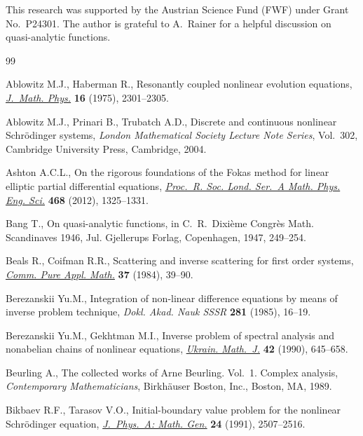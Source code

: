 \documentclass[pdftex]{sigma}
\numberwithin{equation}{section}
\begin{document}
This research was
supported by the Austrian Science Fund (FWF) under Grant No.~P24301.
The author is grateful to A.~Rainer for a helpful discussion on
quasi-analytic functions.

\begin{thebibliography}{99}
\footnotesize\itemsep=0pt

Ablowitz M.J., Haberman R., Resonantly coupled nonlinear evolution equations,
 \href{http://dx.doi.org/10.1063/1.522460}{\textit{J.~Math. Phys.}} \textbf{16} (1975), 2301--2305.

Ablowitz M.J., Prinari B., Trubatch A.D., Discrete and continuous nonlinear
 {S}chr\"odinger systems, \textit{London Mathematical Society Lecture Note
 Series}, Vol.~302, Cambridge University Press, Cambridge, 2004.

Ashton A.C.L., On the rigorous foundations of the {F}okas method for linear
 elliptic partial dif\/ferential equations, \href{http://dx.doi.org/10.1098/rspa.2011.0478}{\textit{Proc.~R. Soc. Lond. Ser.~A
 Math. Phys. Eng. Sci.}} \textbf{468} (2012), 1325--1331.

Bang T., On quasi-analytic functions, in C.~{R}.~{D}ixi\`eme {C}ongr\`es
 {M}ath. {S}candinaves 1946, Jul. Gjellerups Forlag, Copenhagen, 1947,
 249--254.

Beals R., Coifman R.R., Scattering and inverse scattering for f\/irst order
 systems, \href{http://dx.doi.org/10.1002/cpa.3160370105}{\textit{Comm. Pure Appl. Math.}} \textbf{37} (1984), 39--90.

Berezanskii Yu.M., Integration of non-linear dif\/ference equations by means of
 inverse problem technique, \textit{Dokl. Akad. Nauk SSSR} \textbf{281}
 (1985), 16--19.

Berezanskii Yu.M., Gekhtman M.I., Inverse problem of spectral analysis and
 nonabelian chains of nonlinear equations, \href{http://dx.doi.org/10.1007/BF01058907}{\textit{Ukrain. Math.~J.}}
 \textbf{42} (1990), 645--658.

Beurling A., The collected works of {A}rne {B}eurling. {V}ol.~1. Complex
 analysis, \textit{Contemporary Mathematicians}, Birkh\"auser Boston, Inc., Boston, MA,
 1989.

Bikbaev R.F., Tarasov V.O., Initial-boundary value problem for the nonlinear
 {S}chr\"odinger equation, \href{http://dx.doi.org/10.1088/0305-4470/24/11/017}{\textit{J.~Phys.~A: Math. Gen.}} \textbf{24} (1991),
 2507--2516.


\end{thebibliography}
\end{document}
